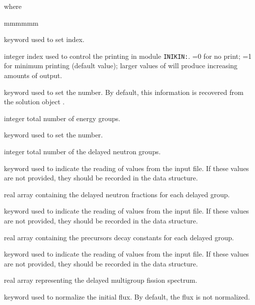 \noindent where
\begin{ListeDeDescription}{mmmmmm}

\item[\moc{EDIT}] keyword used to set  index.

\item[\dusa{iprint}] integer index used to control  the printing in module {\tt INIKIN:}.
=0 for no print; =1 for minimum printing (default value); larger values of 
will produce increasing amounts of output.

\item[\moc{NGRP}] keyword used to set the  number. By default, this information is recovered from the solution object
.

\item[\dusa{ngrp}] integer total number of energy groups.

\item[\moc{NDEL}] keyword used to set the  number.

\item[\dusa{ndg}] integer total number of the delayed neutron groups.

\item[\moc{BETA}] keyword used to indicate the reading of  values from the input file.
If these values are not provided, they should be recorded in the  data structure.

\item[\dusa{beta}] real array containing the delayed neutron fractions for each delayed group.

\item[\moc{LAMBDA}] keyword used to indicate the reading of  values from the input file.
If these values are not provided, they should be recorded in the  data structure.

\item[\dusa{lambda}] real array containing the precursors decay constants for each delayed group.

\item[\moc{CHID}] keyword used to indicate the reading of  values from the input file.
If these values are not provided, they should be recorded in the  data structure.

\item[\dusa{chid}] real array representing the delayed multigroup fission spectrum.

\item[\moc{NORM}] keyword used to normalize the initial flux. By default, the flux is not normalized.


\end{ListeDeDescription}
